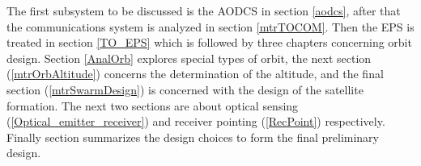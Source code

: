 \label{IntroTradeOff}

The first subsystem to be discussed is the \acl{AODCS} in section \ref{aodcs}, after that the communications system is analyzed in section \ref{mtrTOCOM}. Then the \acl{EPS} is treated in section \ref{TO_EPS} which is followed by three chapters concerning orbit design. Section \ref{AnalOrb} explores special types of orbit, the next section (\ref{mtrOrbAltitude}) concerns the determination of the altitude, and the final section (\ref{mtrSwarmDesign}) is concerned with the design of the satellite formation. The next two sections are about optical sensing (\ref{Optical_emitter_receiver}) and receiver pointing (\ref{RecPoint}) respectively. Finally section summarizes the design choices to form the final preliminary design.